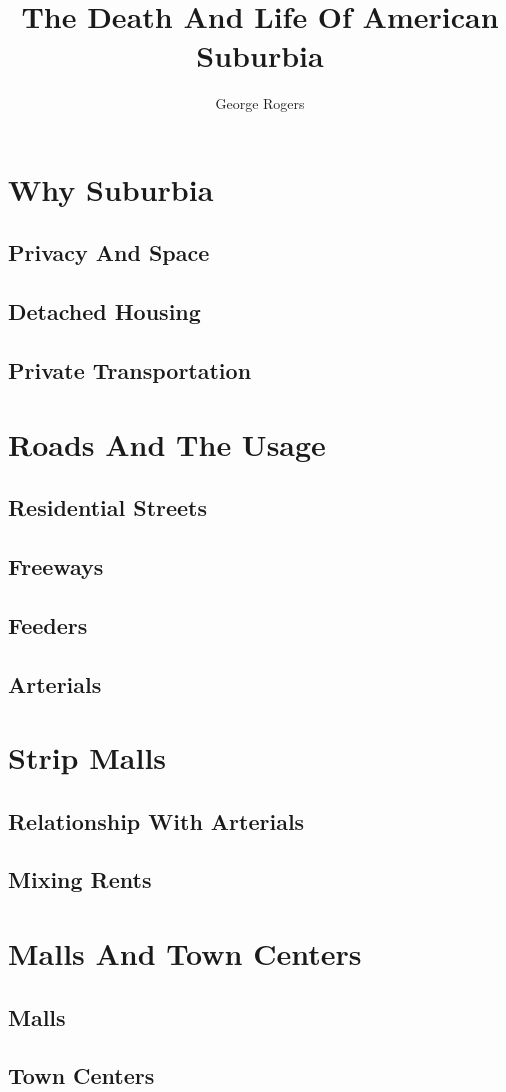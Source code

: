 \documentclass[openany]{amsbook}
\title{The Death And Life Of American Suburbia}
\author{George Rogers}
\begin{document}
\dominitoc
\maketitle

\tableofcontents
\chapter{Why Suburbia}
\minitoc
\lipsum
\section{Privacy And Space}
\lipsum
\section{Detached Housing}
\lipsum
\section{Private Transportation}
\lipsum
\chapter{Roads And The Usage}
\minitoc
\lipsum
\section{Residential Streets}
\lipsum
\section{Freeways}
\lipsum
\section{Feeders}
\lipsum
\section{Arterials}
\lipsum
\chapter{Strip Malls}
\minitoc
\lipsum
\section{Relationship With Arterials}
\lipsum
\section{Mixing Rents}
\lipsum
\chapter{Malls And Town Centers}
\minitoc
\lipsum
\section{Malls}
\lipsum
\section{Town Centers}
\lipsum
\listoffigures
\end{document}
